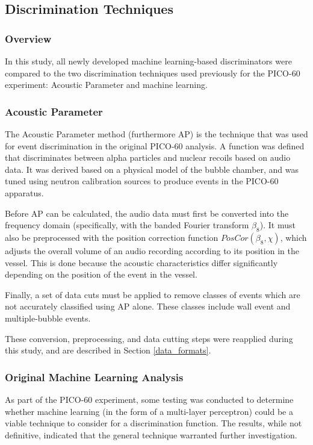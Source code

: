 \documentclass[10pt]{article}
\begin{document}
\subsection{Discrimination Techniques}

\subsubsection{Overview}

In this study, all newly developed machine learning-based discriminators were compared to the two discrimination techniques used previously for the PICO-60 experiment: Acoustic Parameter and machine learning.

\subsubsection{Acoustic Parameter}

The Acoustic Parameter method (furthermore AP) is the technique that was used for event discrimination in the original PICO-60 analysis. A function was defined that discriminates between alpha particles and nuclear recoils based on audio data. It was derived based on a physical model of the bubble chamber, and was tuned using neutron calibration sources to produce events in the PICO-60 apparatus.

Before AP can be calculated, the audio data must first be converted into the frequency domain (specifically, with the banded Fourier transform $\beta_{8}$). It must also be preprocessed with the position correction function $PosCor(\beta_{8}, \chi)$, which adjusts the overall volume of an audio recording according to its position in the vessel. This is done because the acoustic characteristics differ significantly depending on the position of the event in the vessel.

Finally, a set of data cuts must be applied to remove classes of events which are not accurately classified using AP alone. These classes include wall event and multiple-bubble events.

These conversion, preprocessing, and data cutting steps were reapplied during this study, and are described in Section \ref{data_formats}.

\subsubsection{Original Machine Learning Analysis}

As part of the PICO-60 experiment, some testing was conducted to determine whether machine learning (in the form of a multi-layer perceptron) could be a viable technique to consider for a discrimination function. The results, while not definitive, indicated that the general technique warranted further investigation.
\end{document}
